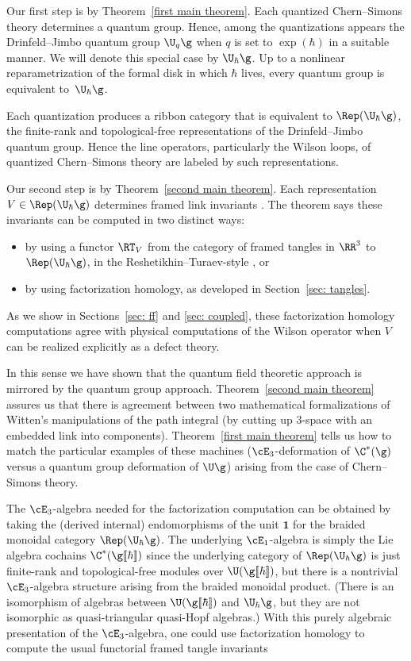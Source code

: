 \documentclass[10pt]{amsart}
\begin{document}
Our first step is by Theorem~\ref{first main theorem}.
Each quantized Chern--Simons theory determines a quantum group.
Hence, among the quantizations appears the Drinfeld--Jimbo quantum group $\U_q \g$
when $q$ is set to $\exp(\hbar)$ in a suitable manner.
We will denote this special case by $\U_\hbar \g$.
Up to a nonlinear reparametrization of the formal disk in which $\hbar$ lives,
every quantum group is equivalent to~$\U_\hbar \g$.

Each quantization produces a ribbon category that is equivalent to $\Rep(\U_\hbar \g)$,
the finite-rank and topological-free representations of the Drinfeld--Jimbo quantum group.
Hence the line operators, particularly the Wilson loops, of quantized Chern--Simons theory
are labeled by such representations.

Our second step is by Theorem~\ref{second main theorem}.
Each representation $V \in \Rep(\U_\hbar \g)$ determines framed link invariants .
The theorem says these invariants can be computed in two distinct ways:
\begin{itemize}
\item by using a functor $\RT_V$ from the category of framed tangles in $\RR^3$ to $\Rep(\U_\hbar \g)$, in the Reshetikhin--Turaev-style \cite{RT,KRT}, or
\item by using factorization homology, as developed in Section~\ref{sec: tangles}.
\end{itemize}
As we show in Sections~\ref{sec: ff} and \ref{sec: coupled}, these factorization homology computations agree with physical computations of the Wilson operator when $V$ can be realized explicitly as a defect theory.

In this sense we have shown that the quantum field theoretic approach is mirrored by the quantum group approach.
Theorem~\ref{second main theorem} assures us that there is agreement between two mathematical formalizations of Witten's manipulations of the path integral (by cutting up 3-space with an embedded link into components).
Theorem~\ref{first main theorem} tells us how to match the particular examples of these machines ($\cE_3$-deformation of $\C^*(\g)$ versus a quantum group deformation of $\U\g$) 
arising from the case of Chern--Simons theory.

\begin{rmk}
The $\cE_3$-algebra needed for the factorization computation can be obtained by taking the (derived internal) endomorphisms of the unit $\mathbf{1}$ for the braided monoidal category $\Rep(\U_\hbar \g)$.
The underlying $\cE_1$-algebra is simply the Lie algebra cochains $\C^*(\g[\![\hbar]\!])$ since the underlying category of $\Rep(\U_\hbar \g)$ is just finite-rank and topological-free modules over $\U(\g[\![\hbar]\!])$,
but there is a nontrivial $\cE_3$-algebra structure arising from the braided monoidal product.
(There is an isomorphism of algebras between $\U(\g[\![\hbar]\!])$ and $\U_\hbar \g$,
but they are not isomorphic as quasi-triangular quasi-Hopf algebras.)
With this purely algebraic presentation of the $\cE_3$-algebra,
one could use factorization homology to compute the usual functorial framed tangle invariants
\end{rmk}
\end{document}
